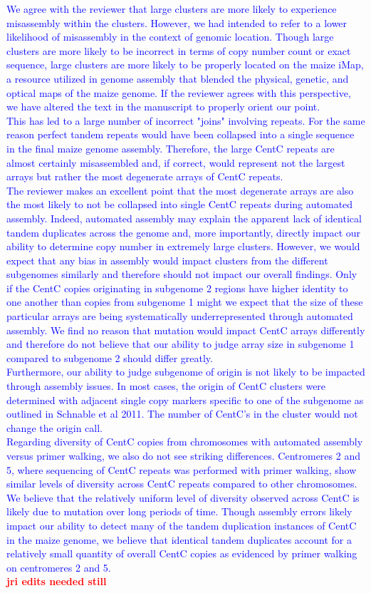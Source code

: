 \documentclass[]{article}
\newcommand{\res}[1]{\noindent \textcolor{blue}{{#1}} \\}
\newcommand{\jri}[1]{\textcolor{red}{{\bf #1}} }
\begin{document}
\res{We agree with the reviewer that large clusters are more likely to experience misassembly within the clusters.  
However, we had intended to refer to a lower likelihood of misassembly in the context of genomic location.  
Though large clusters are more likely to be incorrect in terms of copy number count or exact sequence, large clusters are more likely to be properly located on the maize iMap, a resource utilized in genome assembly that blended the physical, genetic, and optical maps of the maize genome.  
If the reviewer agrees with this perspective, we have altered the text in the manuscript to properly orient our point.}

\res{This has led to a large number of incorrect "joins" involving repeats.  
For the same reason perfect tandem repeats would have been collapsed into a single sequence in the final maize genome assembly.  
Therefore, the large CentC repeats are almost certainly misassembled and, if correct, would represent not the largest arrays but rather the most degenerate arrays of CentC repeats.}

\res{The reviewer makes an excellent point that the most degenerate arrays are also the most likely to not be collapsed into single CentC repeats during automated assembly.  Indeed, automated assembly may explain the apparent lack of identical tandem duplicates across the genome and, more importantly, directly impact our ability to determine copy number in extremely large clusters.  However, we would expect that any bias in assembly would impact clusters from the different subgenomes similarly and therefore should not impact our overall findings.  Only if the CentC copies originating in subgenome 2 regions have higher identity to one another than copies from subgenome 1 might we expect that the size of these particular arrays are being systematically underrepresented through automated assembly. We find no reason that mutation would impact CentC arrays differently and therefore do not believe that our ability to judge array size in subgenome 1 compared to subgenome 2 should differ greatly. }

\res{Furthermore, our ability to judge subgenome of origin is not likely to be impacted through assembly issues. In most cases, the origin of CentC clusters were determined with adjacent single copy markers specific to one of the subgenome as outlined in Schnable et al 2011.  The number of CentC's in the cluster would not change the origin call.}

\res{Regarding diversity of CentC copies from chromosomes with automated assembly versus primer walking, we also do not see striking differences.  Centromeres 2 and 5, where sequencing of CentC repeats was performed with primer walking, show similar levels of diversity across CentC repeats compared to other chromosomes.  We believe that the relatively uniform level of diversity observed across CentC is likely due to mutation over long periods of time.  Though assembly errors likely impact our ability to detect many of the tandem duplication instances of CentC in the maize genome, we believe that identical tandem duplicates account for a relatively small quantity of overall CentC copies as evidenced by primer walking on centromeres 2 and 5. }\jri{jri edits needed still}
\end{document}
